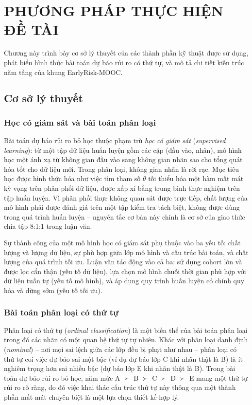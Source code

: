 \chapter{PHƯƠNG PHÁP THỰC HIỆN ĐỀ TÀI}
\label{ch:phuongphap}

Chương này trình bày cơ sở lý thuyết của các thành phần kỹ thuật được sử dụng, phát biểu hình thức bài toán dự báo rủi ro có thứ tự, và mô tả chi tiết kiến trúc năm tầng của khung EarlyRisk-MOOC.

\section{Cơ sở lý thuyết}
\label{sec:colythuyet}

\subsection{Học có giám sát và bài toán phân loại}

Bài toán dự báo rủi ro bỏ học thuộc phạm trù \textit{học có giám sát} (\textit{supervised learning}): từ một tập dữ liệu huấn luyện gồm các cặp (đầu vào, nhãn), mô hình học một ánh xạ từ không gian đầu vào sang không gian nhãn sao cho tổng quát hóa tốt cho dữ liệu mới. Trong phân loại, không gian nhãn là rời rạc. Mục tiêu học được hình thức hóa như việc tìm tham số $\theta$ tối thiểu hóa một hàm mất mát kỳ vọng trên phân phối dữ liệu, được xấp xỉ bằng trung bình thực nghiệm trên tập huấn luyện. Vì phân phối thực không quan sát được trực tiếp, chất lượng của mô hình phải được đánh giá trên một tập kiểm tra tách biệt, không được dùng trong quá trình huấn luyện -- nguyên tắc cơ bản này chính là cơ sở của giao thức chia tập 8:1:1 trong luận văn.

Sự thành công của một mô hình học có giám sát phụ thuộc vào ba yếu tố: chất lượng và lượng dữ liệu, sự phù hợp giữa lớp mô hình và cấu trúc bài toán, và chất lượng của quá trình tối ưu. Luận văn tác động vào cả ba: sử dụng cohort lớn và được lọc cẩn thận (yếu tố dữ liệu), lựa chọn mô hình chuỗi thời gian phù hợp với dữ liệu tuần tự (yếu tố mô hình), và áp dụng quy trình huấn luyện có chính quy hóa và dừng sớm (yếu tố tối ưu).

\subsection{Bài toán phân loại có thứ tự}

Phân loại có thứ tự (\textit{ordinal classification}) là một biến thể của bài toán phân loại trong đó các nhãn có một quan hệ thứ tự tự nhiên. Khác với phân loại danh định (\textit{nominal}) -- nơi mọi sai lệch giữa các lớp đều bị phạt như nhau -- phân loại có thứ tự coi việc dự báo sai một bậc (ví dụ dự báo lớp C khi nhãn thật là B) là ít nghiêm trọng hơn sai nhiều bậc (dự báo lớp E khi nhãn thật là B). Trong bài toán dự báo rủi ro bỏ học, năm mức A $\succ$ B $\succ$ C $\succ$ D $\succ$ E mang một thứ tự rủi ro rõ ràng, do đó việc khai thác cấu trúc thứ tự này thông qua một thành phần mất mát chuyên biệt là một lựa chọn thiết kế hợp lý.

